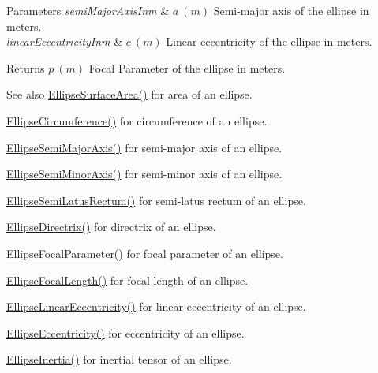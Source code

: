 \begin{DoxyParams}{Parameters}
{\em semi\+Major\+Axis\+Inm} & $ a\ (m)$ Semi-\/major axis of the ellipse in meters. \\
\hline
{\em linear\+Eccentricity\+Inm} & $ c\ (m)$ Linear eccentricity of the ellipse in meters. \\
\hline
\end{DoxyParams}
\begin{DoxyReturn}{Returns}
$ p\ (m)$ Focal Parameter of the ellipse in meters. 
\end{DoxyReturn}
\begin{DoxySeeAlso}{See also}
\mbox{\hyperlink{group___e_g_x_math-_geometry-2_d-_ellipse-_surface_area_ga4ce8c8323e9718ce5458f4ab7f6d823d}{Ellipse\+Surface\+Area()}} for area of an ellipse. 

\mbox{\hyperlink{group___e_g_x_math-_geometry-2_d-_ellipse-_circumference_ga4172802ac674eb53467b44928ac635c7}{Ellipse\+Circumference()}} for circumference of an ellipse. 

\mbox{\hyperlink{group___e_g_x_math-_geometry-2_d-_ellipse-_semi_major_axis_ga646a2ca065f4ac3f666a9ea22f3bb527}{Ellipse\+Semi\+Major\+Axis()}} for semi-\/major axis of an ellipse. 

\mbox{\hyperlink{group___e_g_x_math-_geometry-2_d-_ellipse-_semi_minor_axis_gae461acf3333565d69527dd86e9aa2b32}{Ellipse\+Semi\+Minor\+Axis()}} for semi-\/minor axis of an ellipse. 

\mbox{\hyperlink{group___e_g_x_math-_geometry-2_d-_ellipse-_semi_latus_rectum_gacfd1844eb4ef3d1ee3c0b460a6442ae6}{Ellipse\+Semi\+Latus\+Rectum()}} for semi-\/latus rectum of an ellipse. 

\mbox{\hyperlink{group___e_g_x_math-_geometry-2_d-_ellipse-_directrix_gace8f72a8efbc9c18d3eb689151405106}{Ellipse\+Directrix()}} for directrix of an ellipse. 

\mbox{\hyperlink{group___e_g_x_math-_geometry-2_d-_ellipse-_focal_parameter_ga4cd01a38c72c092ef9791351948bf69b}{Ellipse\+Focal\+Parameter()}} for focal parameter of an ellipse. 

\mbox{\hyperlink{group___e_g_x_math-_geometry-2_d-_ellipse-_focal_length_gab8d63de7640c880cfecaeada6f2afdac}{Ellipse\+Focal\+Length()}} for focal length of an ellipse. 

\mbox{\hyperlink{group___e_g_x_math-_geometry-2_d-_ellipse-_linear_eccentricity_gac70b3010e30aa8b73deb50fe2b9b9a91}{Ellipse\+Linear\+Eccentricity()}} for linear eccentricity of an ellipse. 

\mbox{\hyperlink{group___e_g_x_math-_geometry-2_d-_ellipse-_eccentricity_ga6a0a7fba17f782616894cfc447628c33}{Ellipse\+Eccentricity()}} for eccentricity of an ellipse. 

\mbox{\hyperlink{group___e_g_x_math-_geometry-2_d-_ellipse-_inertia_ga10a3049c2f04b50f271fb01dc62e4cf8}{Ellipse\+Inertia()}} for inertial tensor of an ellipse. 
\end{DoxySeeAlso}
